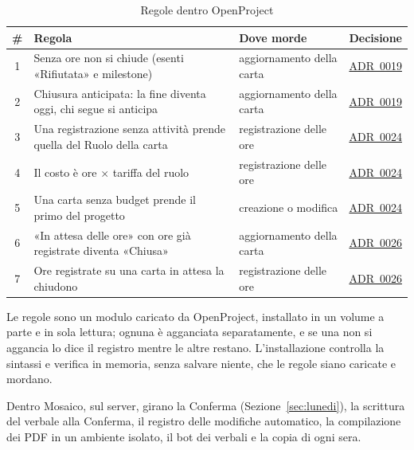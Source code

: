 \documentclass[a4paper, 11pt]{article}
\newcommand{\adr}[1]{\hyperref[adr:#1]{ADR~#1}}
\begin{document}
\begin{table}[htbp]
\centering
\small
\caption{Regole dentro OpenProject}
\label{tab:regoleop}
\begin{tabularx}{\textwidth}{@{} c X l l @{}}
\toprule
\textbf{\#} & \textbf{Regola} & \textbf{Dove morde} & \textbf{Decisione} \\
\midrule
1 & Senza ore non si chiude (esenti «Rifiutata» e milestone) & aggiornamento della carta & \adr{0019} \\
2 & Chiusura anticipata: la fine diventa oggi, chi segue si anticipa & aggiornamento della carta & \adr{0019} \\
3 & Una registrazione senza attività prende quella del Ruolo della carta & registrazione delle ore & \adr{0024} \\
4 & Il costo è ore $\times$ tariffa del ruolo & registrazione delle ore & \adr{0024} \\
5 & Una carta senza budget prende il primo del progetto & creazione o modifica & \adr{0024} \\
6 & «In attesa delle ore» con ore già registrate diventa «Chiusa» & aggiornamento della carta & \adr{0026} \\
7 & Ore registrate su una carta in attesa la chiudono & registrazione delle ore & \adr{0026} \\
\bottomrule
\end{tabularx}
\end{table}
Le regole sono un modulo caricato da OpenProject, installato in un volume a parte e in sola lettura; ognuna è agganciata separatamente, e se una non si aggancia lo dice il registro mentre le altre restano. L'installazione controlla la sintassi e verifica in memoria, senza salvare niente, che le regole siano caricate e mordano.

Dentro Mosaico, sul server, girano la Conferma (Sezione~\ref{sec:lunedi}), la scrittura del verbale alla Conferma, il registro delle modifiche automatico, la compilazione dei PDF in un ambiente isolato, il bot dei verbali e la copia di ogni sera.
\end{document}
